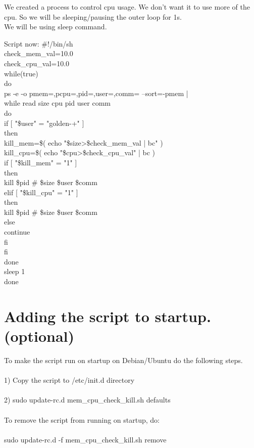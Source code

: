 \documentclass[12pt,a4paper]{article}
\begin{document}
We created a process to control cpu usage. We don't want it to use more of the cpu. So we will be sleeping/pausing the outer loop for 1s.\\We will be using sleep command.\\
\begin{flushleft}
Script now:
\newline
\#!/bin/sh\\
check\_mem\_val=10.0\\
check\_cpu\_val=10.0\\
while(true)\\
do\\
ps -e -o pmem=,pcpu=,pid=,user=,comm= --sort=-pmem |\\
  while read size cpu pid user comm\\
  do\\
if [ "\$user" = "golden-+" ]\\
    then\\
kill\_mem=\$( echo "\$size>\$check\_mem\_val | bc" )\\
kill\_cpu=\$( echo "\$cpu>\$check\_cpu\_val" | bc )\\
 if [ "\$kill\_mem" = "1" ]\\
      then\\
        kill \$pid \# \$size \$user \$comm\\
      elif [ "\$kill\_cpu" = "1" ]\\
      then\\
        kill \$pid \# \$size \$user \$comm\\
      else\\
        continue\\
      fi\\
fi\\
  done\\
sleep 1\\
done\\
\end{flushleft}
\newpage
\section{Adding the script to startup.(optional)}

To make the script run on startup on Debian/Ubuntu do the following steps.\\\\1) Copy the script to /etc/init.d directory\\\\2) sudo update-rc.d mem\_cpu\_check\_kill.sh defaults\\\\
To remove the script from running on startup, do:\\\\
sudo update-rc.d -f mem\_cpu\_check\_kill.sh remove\\\\
\end{document}
